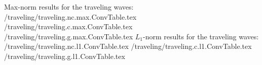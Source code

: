 \clearpage
Max-norm results for the traveling waves:
 \travelingDir/traveling/traveling.nc.max.ConvTable.tex
%
 \travelingDir/traveling/traveling.c.max.ConvTable.tex
 \travelingDir/traveling/traveling.g.max.ConvTable.tex
\clearpage
$L_1$-norm results for the traveling waves:
 \travelingDir/traveling/traveling.nc.l1.ConvTable.tex
 \travelingDir/traveling/traveling.c.l1.ConvTable.tex
 \travelingDir/traveling/traveling.g.l1.ConvTable.tex

